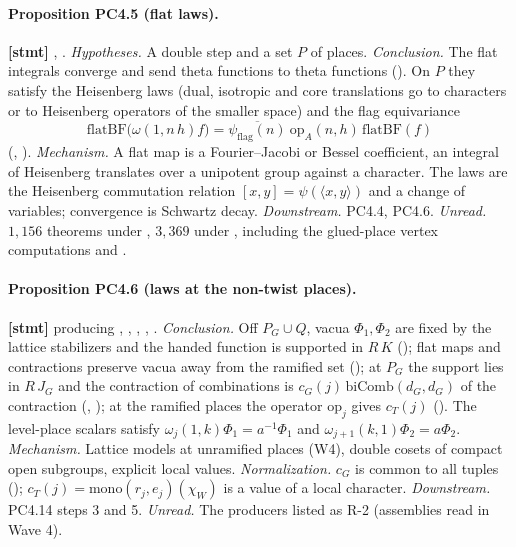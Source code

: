 \documentclass[11pt]{article}
\begin{document}
\paragraph{Proposition PC4.5 (flat laws).} \textbf{[stmt]} , .
\emph{Hypotheses.} A double step and a set $P$ of places. \emph{Conclusion.} The flat integrals converge and send theta functions to theta functions (). On $P$ they satisfy the Heisenberg laws  (dual, isotropic and core translations go to characters or to Heisenberg operators of the smaller space) and the flag equivariance
\[
\mathrm{flatBF}\bigl(\omega(1,n\,h)f\bigr)=\overline{\psi_{\mathrm{flag}}(n)}\ \mathrm{op}_A(n,h)\,\mathrm{flatBF}(f)
\]
(, ). \emph{Mechanism.} A flat map is a Fourier--Jacobi or Bessel coefficient, an integral of Heisenberg translates over a unipotent group against a character. The laws are the Heisenberg commutation relation $[x,y]=\psi(\langle x,y\rangle)$ and a change of variables; convergence is Schwartz decay. \emph{Downstream.} PC4.4, PC4.6. \emph{Unread.} $1{,}156$ theorems under , $3{,}369$ under , including the glued-place vertex computations  and .

\paragraph{Proposition PC4.6 (laws at the non-twist places).} \textbf{[stmt]}  producing , , , , .
\emph{Conclusion.} Off $P_G\cup Q$, vacua $\Phi_1,\Phi_2$ are fixed by the lattice stabilizers and the handed function is supported in $R\,K$ (); flat maps and contractions preserve vacua away from the ramified set (); at $P_G$ the support lies in $R\,J_G$ and the contraction of combinations is $c_G(j)\,\mathrm{biComb}(d_G,d_G)$ of the contraction (, ); at the ramified places the operator $\mathrm{op}_j$ gives $c_T(j)$ (). The level-place scalars satisfy $\omega_j(1,k)\Phi_1=a^{-1}\Phi_1$ and $\omega_{j+1}(k,1)\Phi_2=a\Phi_2$. \emph{Mechanism.} Lattice models at unramified places (W4), double cosets of compact open subgroups, explicit local values. \emph{Normalization.} $c_G$ is common to all tuples (); $c_T(j)=\mathrm{mono}(r_j,e_j)(\chi_W)$ is a value of a local character. \emph{Downstream.} PC4.14 steps 3 and 5. \emph{Unread.} The producers listed as R-2 (assemblies read in Wave 4).
\end{document}
